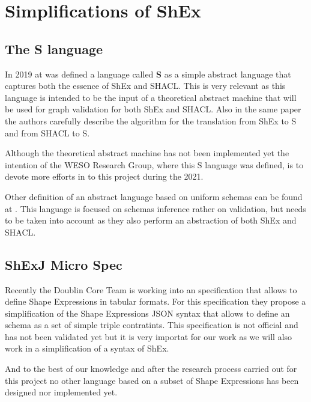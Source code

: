 \section{Simplifications of ShEx}

\subsection{The \textbf{S} language}

In 2019 at  was defined a language called \textbf{S} as a simple abstract
language that captures both the essence of ShEx and SHACL. This is very relevant as this language
is intended to be the input of a theoretical abstract machine that will be used for graph validation
for both ShEx and SHACL. Also in the same paper the authors carefully describe the algorithm for the
translation from ShEx to S and from SHACL to S.

Although the theoretical abstract machine has not been implemented yet the intention of the WESO
Research Group, where this S language was defined, is to devote more efforts in to this project
during the 2021.

Other definition of an abstract language based on uniform schemas can be found at .
This language is focused on schemas inference rather on validation, but needs to be taken
into account as they also perform an abstraction of both ShEx and SHACL.

\subsection{ShExJ Micro Spec}
Recently the Doublin Core Team is working into an
specification that allows to define Shape Expressions in tabular formats. For this specification
they propose a simplification of the Shape Expressions JSON syntax that allows to define an
schema as a set of simple triple contratints. This specification is not official and has
not been validated yet but it is very importat for our work as we will also work in a
simplification of a syntax of ShEx.

\bigskip

And to the best of our knowledge and after the research process carried out for this
project no other language based on a subset of Shape Expressions has been designed nor implemented yet.